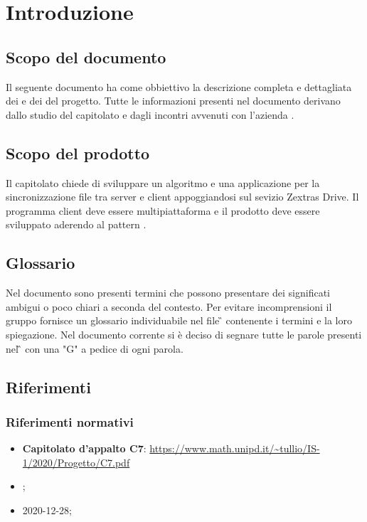 \section{Introduzione}
\subsection{Scopo del documento}
Il seguente documento ha come obbiettivo la descrizione completa e dettagliata dei  e dei   del progetto. Tutte le informazioni presenti nel documento derivano dallo studio del capitolato e dagli incontri avvenuti con l'azienda .

\subsection{Scopo del prodotto}
Il capitolato chiede di sviluppare un algoritmo e una applicazione per la sincronizzazione file tra server e client appoggiandosi sul sevizio Zextras Drive.
Il programma client deve essere multipiattaforma e il prodotto deve essere sviluppato aderendo al pattern .

\subsection{Glossario}
Nel documento sono presenti termini che possono presentare dei significati ambigui o poco chiari a seconda del contesto.
Per evitare incomprensioni il gruppo fornisce un glossario individuabile nel file \G{} \versGlo{} contenente i termini e la loro spiegazione.\newline{}
Nel documento corrente si è deciso di segnare tutte le parole presenti nel \G{} con una "G" a pedice di ogni parola.

\subsection{Riferimenti}
\subsubsection{Riferimenti normativi}
\begin{itemize}
\item \textbf{Capitolato d'appalto C7}:\newline
      \url{https://www.math.unipd.it/~tullio/IS-1/2020/Progetto/C7.pdf}
\item \NdP{} \versNdP ;
\item \VE{} 2020-12-28; %
\end{itemize}

